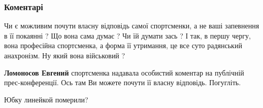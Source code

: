  
 
 
 
 
\subsubsection{Коментарі}

\begin{itemize}
 

Чи є можливим почути власну відповідь самої спортсменки, а не ваші запевнення в
її покаянні ? Що вона сама думає ? Чи їй думати зась ? І так, в першу чергу,
вона професійна спортсменка, а форма її утримання, це все суто радянський
анахронізм. Ну який вона військовий ?

\begin{itemize}
 
\textbf{Ломоносов Евгений} спортсменка надавала особистий коментар на публічній
прес-конференції. Ось там Ви можете почути її власну відповідь. Погугліть.
\end{itemize}

 

Юбку линейкой померили?

 

\end{itemize}
